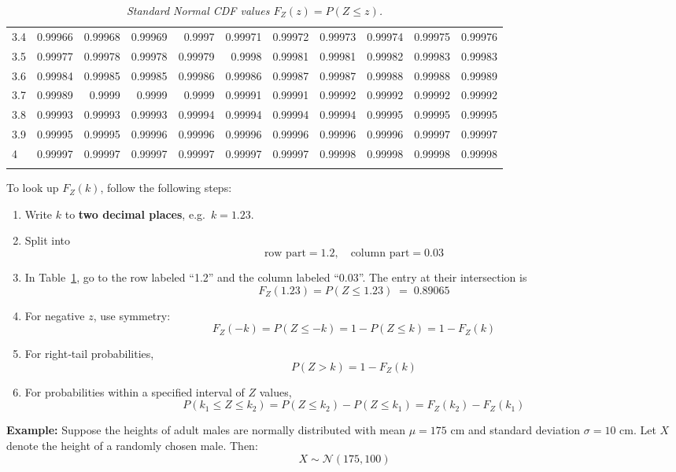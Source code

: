 \documentclass[twoside]{book}
\begin{document}
\begin{table}[!h]
\begin{tabular}{l|*{10}{r}}
3.4 & 0.99966 & 0.99968 & 0.99969 & 0.9997  & 0.99971 & 0.99972 & 0.99973 & 0.99974 & 0.99975 & 0.99976 \\
3.5 & 0.99977 & 0.99978 & 0.99978 & 0.99979 & 0.9998  & 0.99981 & 0.99981 & 0.99982 & 0.99983 & 0.99983 \\
3.6 & 0.99984 & 0.99985 & 0.99985 & 0.99986 & 0.99986 & 0.99987 & 0.99987 & 0.99988 & 0.99988 & 0.99989 \\
3.7 & 0.99989 & 0.9999  & 0.9999  & 0.9999  & 0.99991 & 0.99991 & 0.99992 & 0.99992 & 0.99992 & 0.99992 \\
3.8 & 0.99993 & 0.99993 & 0.99993 & 0.99994 & 0.99994 & 0.99994 & 0.99994 & 0.99995 & 0.99995 & 0.99995 \\
3.9 & 0.99995 & 0.99995 & 0.99996 & 0.99996 & 0.99996 & 0.99996 & 0.99996 & 0.99996 & 0.99997 & 0.99997 \\
4   & 0.99997 & 0.99997 & 0.99997 & 0.99997 & 0.99997 & 0.99997 & 0.99998 & 0.99998 & 0.99998 & 0.99998 \\
\addlinespace
\bottomrule
\end{tabular}
\caption{\textit{Standard Normal CDF values $F_Z(z)=P(Z\le z)$.}}
\label{table:Ztable}
\end{table}

To look up \(F_Z(k)\), follow the following steps:

\begin{enumerate}
  \item Write \(k\) to \textbf{two decimal places}, e.g.\ \(k=1.23\).
  \item Split into
    \[
      \text{row part} = 1.2,\quad
      \text{column part} = 0.03
    \]
  \item In Table~\ref{table:Ztable}, go to the row labeled “1.2” and the column
    labeled “0.03”.  The entry at their intersection is
    \[
      F_Z(1.23) = P(Z\le 1.23) \;=\; 0.89065
    \]
  \item For negative \(z\), use symmetry:
    \[
      F_Z(-k) = P(Z\le -k)
      = 1 - P(Z\le k) = 1 - F_Z(k)
    \]
  \item For right‐tail probabilities,
    \[
      P(Z>k) = 1 - F_Z(k)
    \]
  \item For probabilities within a specified interval of $ Z $ values,
  $$P(k_1 \leq Z \leq k_2) = P(Z \leq k_2) - P(Z \leq k_1) = F_Z(k_2) - F_Z(k_1)$$
\end{enumerate}

\textbf{Example:} Suppose the heights of adult males are normally distributed with mean $\mu = 175$ cm and standard deviation $\sigma = 10$ cm. Let $X$ denote the height of a randomly chosen male. Then:
\[
X \sim \mathcal{N}(175, 100)
\]
\end{document}
